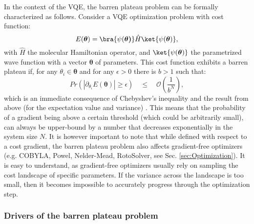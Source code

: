 In the context of the VQE, the barren plateau problem can be formally characterized as follows. Consider a VQE optimization problem with cost function:
\begin{equation} \label{eq:vqe_cost}
E(\boldsymbol{\theta}) = \bra{\psi(\boldsymbol{\theta)}} \hat{H} \ket{\psi(\boldsymbol{\theta})},
\end{equation}
with $\hat{H}$ the molecular Hamiltonian operator, and $\ket{\psi(\boldsymbol{\theta})}$ the parametrized wave function with a vector $\boldsymbol{\theta}$ of parameters.
This cost function exhibits a barren plateau if, for any $\theta_i \in \boldsymbol{\theta}$ and for any $\epsilon > 0 $ there is $b > 1$ such that:
\begin{equation}
    Pr( |\partial_{\theta_i} E(\boldsymbol{\theta})| \geqslant \epsilon ) \quad \leqslant \quad \mathcal{O}(\frac{1}{b^N}),
\end{equation}
which is an immediate consequence of Chebyshev's inequality and the result from above (for the expectation value and variance) \cite{Cerezo2021_BP}. This means that the probability of a gradient being above a certain threshold (which could be arbitrarily small), can always be upper-bound by a number that decreases exponentially in the system size $N$. It is however important to note that while defined with respect to a cost gradient, the barren plateau problem also affects gradient-free optimizers \cite{Arrasmith2020_BP_GF, OrtizMarrero2020} (e.g. COBYLA, Powel, Nelder-Mead, RotoSolver, see Sec. \ref{sec:Optimization}). It is easy to understand, as gradient-free optimizers usually rely on sampling the cost landscape of specific parameters. If the variance across the landscape is too small, then it becomes impossible to accurately progress through the optimization step.

\subsubsection{Drivers of the barren plateau problem}

